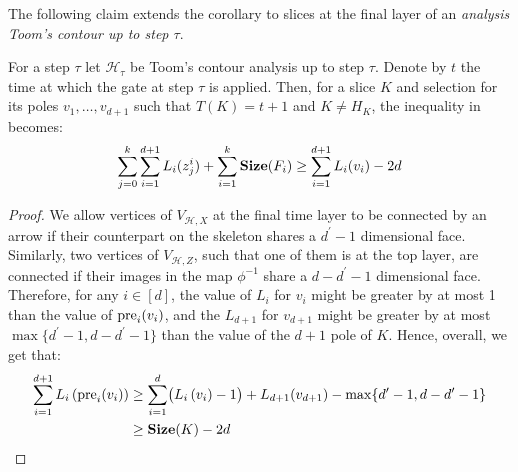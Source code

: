   
  The following claim extends the corollary to slices at the final layer of an \textit{analysis Toom's contour up to step $\tau$}. 
  \begin{claim}
    \label{claim:shrinkan}
For a step $\tau$  let $\mathcal{H}_{\tau}$ be Toom's contour analysis up to step $\tau$. Denote by $t$ the time at which the gate at step $\tau$ is applied. Then, for a slice $K$ and selection for its poles $v_{1}, \ldots, v_{d+1}$ such that $T(K) = t+1$ and $K \neq H_{K}$, the inequality in  becomes:
        \begin{equation*}
          \begin{split}
            \sum_{j=0}^{k}\sum_{i=1}^{d+1} L_{i}(z_{j}^{i}) +  \sum^{k}_{i=1}\mathbf{Size}(F_{i}) \ge \sum_{i=1}^{d+1}L_{i}(v_i) - 2d 
          \end{split}
        \end{equation*}
  \end{claim}
  \begin{proof}
We allow vertices of $V_{\mathcal{H},X}$ at the final time layer to be connected by an arrow if their counterpart on the skeleton shares a $d^{\prime}-1$ dimensional face. Similarly, two vertices of $V_{\mathcal{H}, Z}$, such that one of them is at the top layer, are connected if their images in the map $\phi^{-1}$ share a $d-d^{\prime}-1$ dimensional face. Therefore, for any $i \in [d]$, the value of $L_{i}$ for $v_{i}$ might be greater by at most 1 than the value of $\text{pre}_{i}(v_{i})$, and the $L_{d+1}$ for $v_{d+1}$ might be greater by at most $\max\{ d^{\prime} - 1, d - d^{\prime} - 1 \}$ than the value of the $d+1$ pole of $K$. Hence, overall, we get that:
    \begin{equation*}
      \begin{split}
        \sum_{i=1}^{d+1}L_{i}\left( \text{pre}_{i}(v_{i}) \right) & \ge \sum_{i=1}^{d}\bigl( L_{i}\left( v_{i} \right) - 1 \bigr) + L_{d+1}(v_{d+1}) - \max\{ d^{\prime} - 1, d - d^{\prime}-1\}  \\ 
        & \ge  \mathbf{Size}(K) - 2d
      \end{split}
    \end{equation*}
  \end{proof}







